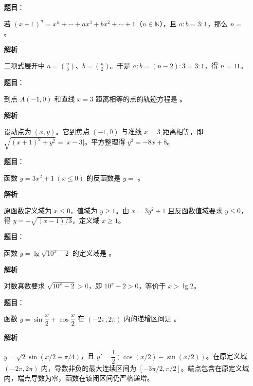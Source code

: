 \begin{answer}

\textbf{题目}：

若 $(x+1)^n=x^n+\cdots+ax^3+bx^2+\cdots+1$（$n\in\mathbb N$），且 $a:b=3:1$，那么 $n=$ \gkblank{}。

\textbf{解析}

二项式展开中 $a=\binom n3$、$b=\binom n2$。于是 $a:b=(n-2):3=3:1$，得 $n=11$。


\end{answer}
\begin{answer}

\textbf{题目}：

到点 $A(-1,0)$ 和直线 $x=3$ 距离相等的点的轨迹方程是 \gkblank{}。

\textbf{解析}

设动点为 $(x,y)$。它到焦点 $(-1,0)$ 与准线 $x=3$ 距离相等，即 $\sqrt{(x+1)^2+y^2}=|x-3|$。平方整理得 $y^2=-8x+8$。


\end{answer}
\begin{answer}

\textbf{题目}：

函数 $y=3x^2+1\;(x\le0)$ 的反函数是 $y=$ \gkblank{}。

\textbf{解析}

原函数定义域为 $x\le0$，值域为 $y\ge1$。由 $x=3y^2+1$ 且反函数值域要求 $y\le0$，得 $y=-\sqrt{(x-1)/3}$，定义域 $x\ge1$。


\end{answer}
\begin{answer}

\textbf{题目}：

函数 $y=\lg\sqrt{10^x-2}$ 的定义域是 \gkblank{}。

\textbf{解析}

对数真数要求 $\sqrt{10^x-2}>0$，即 $10^x-2>0$，等价于 $x>\lg2$。


\end{answer}
\begin{answer}

\textbf{题目}：

函数 $y=\sin\dfrac x2+\cos\dfrac x2$ 在 $(-2\pi,2\pi)$ 内的递增区间是 \gkblank{}。

\textbf{解析}

$y=\sqrt2\sin(x/2+\pi/4)$，且 $y'=\dfrac12(\cos(x/2)-\sin(x/2))$。在原定义域 $(-2\pi,2\pi)$ 内，导数非负的最大连续区间为 $[-3\pi/2,\pi/2]$。端点包含在原定义域内，端点导数为零，函数在该闭区间仍严格递增。


\end{answer}
